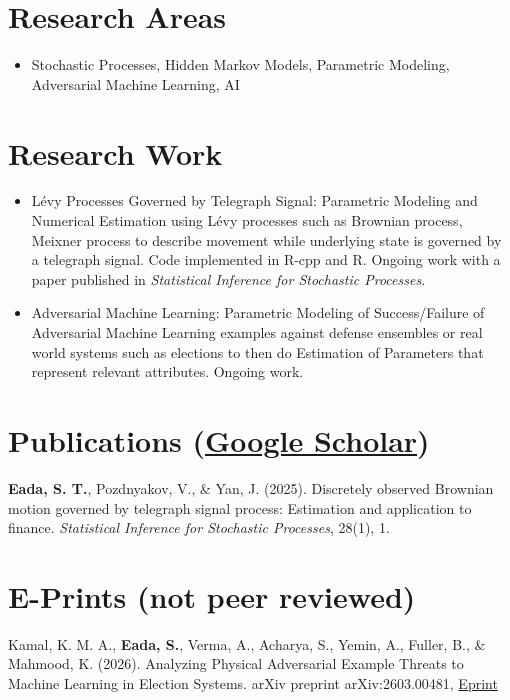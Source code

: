 \documentclass[letterpaper,11pt]{article}
\begin{document}
\section{Research Areas}
\begin{itemize}
\item Stochastic Processes, Hidden Markov Models, Parametric Modeling, Adversarial Machine Learning, AI
\end{itemize}

\section{Research Work}
\begin{itemize}

\item L\'evy Processes Governed by Telegraph Signal: Parametric Modeling and Numerical Estimation using L\'evy processes such as Brownian process, Meixner process to describe movement while underlying state is governed by a telegraph signal. Code implemented in R-cpp and R. Ongoing work with a paper published in \textit{Statistical Inference for Stochastic Processes}.

\item Adversarial Machine Learning: Parametric Modeling of Success/Failure of Adversarial Machine Learning examples against defense ensembles or real world systems such as elections to then do Estimation of Parameters that represent relevant attributes. Ongoing work.

\end{itemize}


\section*{Publications (\href{https://scholar.google.com/citations?user=gxKgkdgAAAAJ\&hl=en\&oi=ao}{Google Scholar})}
\textbf{Eada, S. T.}, Pozdnyakov, V., \& Yan, J. (2025). Discretely observed Brownian motion governed by telegraph signal process: Estimation and application to finance. \textit{Statistical Inference for Stochastic Processes}, 28(1), 1.

\section*{E-Prints (not peer reviewed)}
Kamal, K. M. A., \textbf{Eada, S.}, Verma, A., Acharya, S., Yemin, A., Fuller, B., \& Mahmood, K. (2026). Analyzing Physical Adversarial Example Threats to Machine Learning in Election Systems. arXiv preprint arXiv:2603.00481, \href{https://arxiv.org/pdf/2603.00481}{Eprint}
\end{document}
